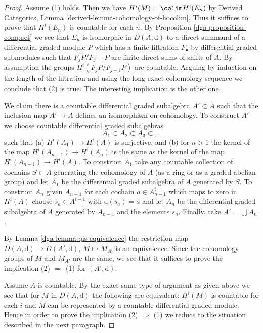 \begin{proof}

Assume (1) holds. Then we have $H^i(M) = \colim H^i(E_n)$ by
Derived Categories, Lemma \ref{derived-lemma-cohomology-of-hocolim}.
Thus it suffices to prove that $H^i(E_n)$ is countable for each $n$.
By Proposition \ref{dga-proposition-compact} we see that $E_n$
is isomorphic in $D(A, \text{d})$ to a direct summand of a
differential graded module $P$ which has a finite filtration
$F_\bullet$ by differential graded submodules
such that $F_jP/F_{j - 1}P$ are finite direct sums of shifts of $A$.
By assumption the groups $H^i(F_jP/F_{j - 1}P)$ are countable.
Arguing by induction on the length of the filtration and using
the long exact cohomology sequence we conclude that (2) is true.
The interesting implication is the other one.

\medskip\noindent
We claim there is a countable differential graded
subalgebra $A' \subset A$ such that the inclusion map
$A' \to A$ defines an isomorphism on cohomology.
To construct $A'$ we choose countable differential graded
subalgebras
$$
A_1 \subset A_2 \subset A_3 \subset \ldots
$$
such that (a) $H^i(A_1) \to H^i(A)$ is surjective, and (b)
for $n > 1$ the kernel of the map $H^i(A_{n - 1}) \to H^i(A_n)$
is the same as the kernel of the map $H^i(A_{n - 1}) \to H^i(A)$.
To construct $A_1$ take any countable collection of cochains
$S \subset A$ generating the cohomology of $A$ (as a ring or as
a graded abelian group) and let
$A_1$ be the differential graded subalgebra of $A$ generated by $S$.
To construct $A_n$ given $A_{n - 1}$ for each cochain $a \in A_{n - 1}^i$
which maps to zero in $H^i(A)$ choose $s_a \in A^{i - 1}$
with $\text{d}(s_a) = a$ and let $A_n$ be the differential graded
subalgebra of $A$ generated by $A_{n - 1}$ and the elements $s_a$.
Finally, take $A' = \bigcup A_n$.

\medskip\noindent
By Lemma \ref{dga-lemma-qis-equivalence}
the restriction map $D(A, \text{d}) \to D(A', \text{d})$,
$M \mapsto M_{A'}$ is an equivalence. Since the cohomology
groups of $M$ and $M_{A'}$ are the same, we see that it
suffices to prove the implication (2) $\Rightarrow$ (1)
for $(A', \text{d})$.

\medskip\noindent
Assume $A$ is countable. By the exact same type of argument as
given above we see that for $M$ in $D(A, \text{d})$
the following are equivalent: $H^i(M)$ is countable for each $i$
and $M$ can be represented by a countable differential graded module.
Hence in order to prove the implication (2) $\Rightarrow$ (1)
we reduce to the situation described in the next paragraph.


\end{proof}
